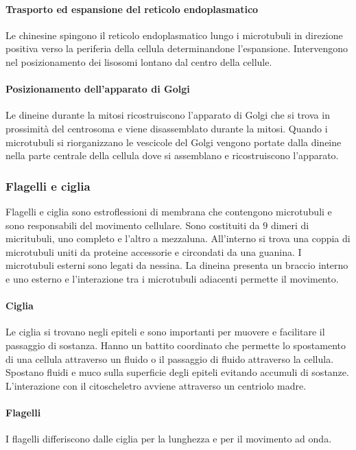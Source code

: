 			\paragraph{Trasporto ed espansione del reticolo endoplasmatico}
			Le chinesine spingono il reticolo endoplasmatico lungo i microtubuli in direzione positiva verso la periferia della cellula determinandone l'espansione.
			Intervengono nel posizionamento dei lisosomi lontano dal centro della cellule.

			\paragraph{Posizionamento dell'apparato di Golgi}
			Le dineine durante la mitosi ricostruiscono l'apparato di Golgi che si trova in prossimit\`a del centrosoma e viene disassemblato durante la mitosi.
			Quando i microtubuli si riorganizzano le vescicole del Golgi vengono portate dalla dineine nella parte centrale della cellula dove si assemblano e ricostruiscono l'apparato.

		\subsubsection{Flagelli e ciglia}
		Flagelli e ciglia sono estroflessioni di membrana che contengono microtubuli e sono responsabili del movimento cellulare.
		Sono costituiti da $9$ dimeri di micritubuli, uno completo e l'altro a mezzaluna.
		All'interno si trova una coppia di microtubuli uniti da proteine accessorie e circondati da una guanina.
		I microtubuli esterni sono legati da nessina.
		La dineina presenta un braccio interno e uno esterno e l'interazione tra i microtubuli adiacenti permette il movimento.

			\paragraph{Ciglia}
			Le ciglia si trovano negli epiteli e sono importanti per muovere e facilitare il passaggio di sostanza.
			Hanno un battito coordinato che permette lo spostamento di una cellula attraverso un fluido o il passaggio di fluido attraverso la cellula.
			Spostano fluidi e muco sulla superficie degli epiteli evitando accumuli di sostanze.
			L'interazione con il citoscheletro avviene attraverso un centriolo madre.

			\paragraph{Flagelli}
			I flagelli differiscono dalle ciglia per la lunghezza e per il movimento ad onda.

